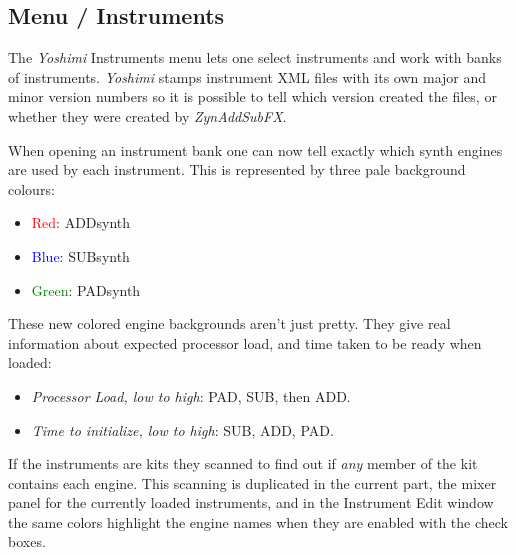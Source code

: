 %
%
%

\subsection{Menu / Instruments}
\label{subsec:menu_instrument}

   The \textsl{Yoshimi} Instruments menu lets one select instruments and work
   with banks of instruments.
   \textsl{Yoshimi} stamps instrument XML files with its own major and minor
   version numbers so it is possible to tell which version created the files,
   or whether they were created by \textsl{ZynAddSubFX}.

   When opening an instrument bank one can now tell exactly which synth engines
   are used by each instrument. This is represented by three pale background
   colours:

   \begin{itemize}
      \item \textcolor{red}{Red}: ADDsynth
      \item \textcolor{blue}{Blue}: SUBsynth
      \item \textcolor{green}{Green}: PADsynth
   \end{itemize}

   These new colored engine backgrounds aren't just pretty. They give real
   information about expected processor load, and time taken to be ready when
   loaded:

   \begin{itemize}
      \item \textsl{Processor Load, low to high}: PAD, SUB, then ADD.
      \item \textsl{Time to initialize, low to high}: SUB, ADD, PAD.
   \end{itemize}

   If the instruments are kits they scanned to find out if 
   \textsl{any} member of the kit contains each engine.
   This scanning is duplicated in the current part, the mixer panel for the
   currently loaded instruments, and in the Instrument Edit window the same
   colors highlight the engine names when they are enabled with the check
   boxes. 

